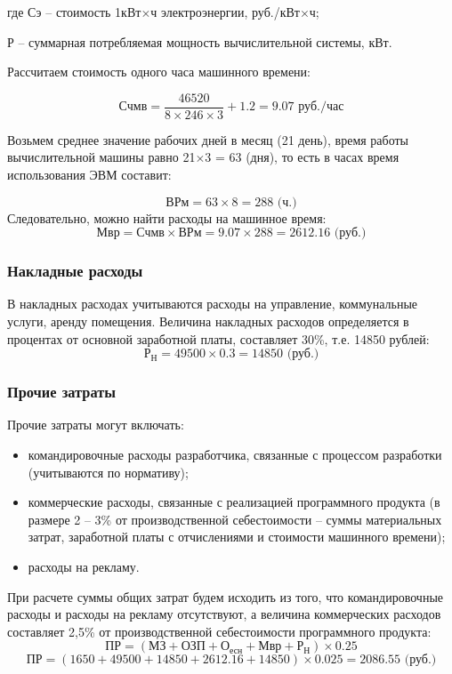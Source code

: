 \documentclass[a4paper]{extarticle}
\begin{document}
где Сэ – стоимость 1кВт$\times$ч электроэнергии, руб./кВт$\times$ч;\par
Р – суммарная потребляемая мощность вычислительной системы, кВт.\par
Рассчитаем стоимость одного часа машинного времени:\par
\begin{equation}
\label{form9}
	\text{Счмв}=\frac{46520}{8\times 246\times 3}+1.2 = 9.07\text{ руб./час}
\end{equation}\par
Возьмем среднее значение рабочих дней в месяц (21 день), время работы вычислительной машины равно 21$\times$3 = 63 (дня), то есть в часах время использования ЭВМ составит:\par
\begin{equation}
\label{form10}
	\text{ВРм}=63\times 8=288\text{ (ч.)}
\end{equation}
Следовательно, можно найти расходы на машинное время:
\begin{equation}
\label{form11}
	\text{Мвр}=\text{Счмв}\times\text{ВРм}=9.07\times 288 = 2612.16\text{ (руб.)}
\end{equation}
\subsubsection{Накладные расходы}
В накладных расходах учитываются расходы на управление, коммунальные услуги, аренду помещения. Величина накладных расходов определяется в процентах от основной заработной платы, составляет 30\%, т.е. 14850 рублей:
\begin{equation}
\label{form12}
	\text{Р}_\text{Н}=49500\times 0.3=14850\text{ (руб.)}
\end{equation}

\subsubsection{Прочие затраты}
Прочие затраты могут включать:
\begin{itemize}
\item командировочные расходы разработчика, связанные с процессом разработки (учитываются по нормативу);
\item коммерческие расходы, связанные с реализацией программного продукта (в размере 2 – 3\% от производственной себестоимости – суммы материальных затрат, заработной платы с отчислениями и стоимости машинного времени);
\item расходы на рекламу.
\end{itemize}\par
При расчете суммы общих затрат будем исходить из того, что командировочные расходы и расходы на рекламу отсутствуют, а величина коммерческих расходов составляет 2,5\% от производственной себестоимости программного продукта:
\begin{equation}
\label{form13}
	\text{ПР}=(\text{МЗ}+\text{ОЗП}+\text{О}_\text{есн}+\text{Мвр}+\text{Р}_\text{Н})\times 0.25
\end{equation}
$$\text{ПР}=(1650+49500+14850+2612.16+14850)\times 0.025=2086.55\text{ (руб.)}$$
\end{document}
